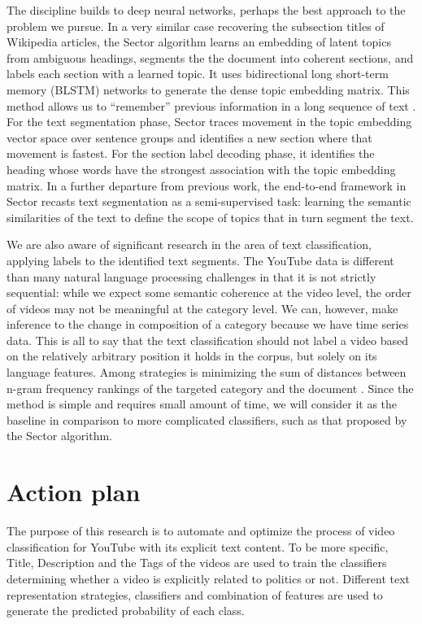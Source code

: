 \documentclass[letterpaper, 12pt]{article}
\begin{document}
The discipline builds to deep neural networks, perhaps the best approach to the problem we pursue. In a very similar case recovering the subsection titles of Wikipedia articles, the Sector algorithm \cite{sebastian-etal-2019-sector} learns an embedding of latent topics from ambiguous headings, segments the the document into coherent sections, and labels each section with a learned topic. It uses bidirectional long short-term memory (BLSTM) networks to generate the dense topic embedding matrix. This method allows us to ``remember'' previous information in a long sequence of text \cite{hochreiter-1997-lstm}. For the text segmentation phase, Sector traces movement in the topic embedding vector space over sentence groups and identifies a new section where that movement is fastest. For the section label decoding phase, it identifies the heading whose words have the strongest association with the topic embedding matrix. In a further departure from previous work, the end-to-end framework in Sector recasts text segmentation as a semi-supervised task: learning the semantic similarities of the text to define the scope of topics that in turn segment the text.

We are also aware of significant research in the area of text classification, applying labels to the identified text segments. The YouTube data is different than many natural language processing challenges in that it is not strictly sequential: while we expect some semantic coherence at the video level, the order of videos may not be meaningful at the category level. We can, however, make inference to the change in composition of a category because we have time series data. This is all to say that the text classification should not label a video based on the relatively arbitrary position it holds in the corpus, but solely on its language features. Among strategies is minimizing the sum of distances between n-gram frequency rankings of the targeted category and the document \cite{cavnar-1994-ngram}. Since the method is simple and requires small amount of time, we will consider it as the baseline in comparison to more complicated classifiers, such as that proposed by the Sector algorithm.

\section{Action plan}

The purpose of this research is to automate and optimize the process of video classification for YouTube with its explicit text content. To be more specific, Title, Description and the Tags of the videos are used to train the classifiers determining whether a video is explicitly related to politics or not. Different text representation strategies, classifiers and combination of features are used to generate the predicted probability of each class. 
\end{document}
